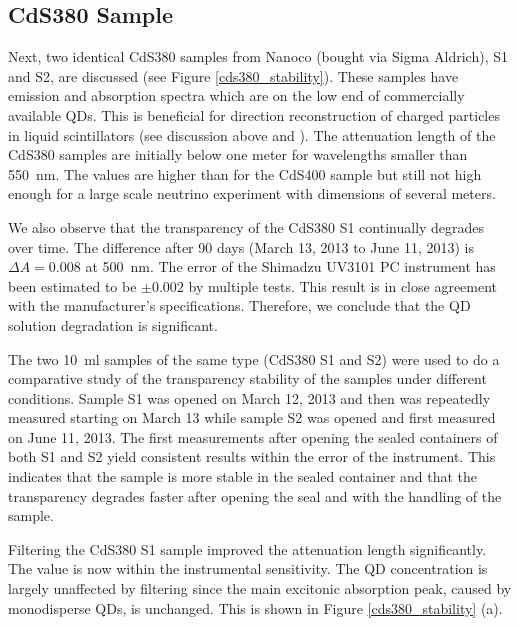 \documentclass[cits]{JINST}
\begin{document}
\subsection{CdS380 Sample}
Next, two identical CdS380 samples from Nanoco (bought via Sigma Aldrich), S1 and S2, are discussed (see Figure \ref{cds380_stability}). These samples have emission and absorption spectra which are on the low end of commercially available QDs. This is beneficial for direction reconstruction of charged particles in liquid scintillators (see discussion above and \cite{mitpaper,simpaper}). The attenuation length of the CdS380 samples are initially below one meter for wavelengths smaller than 550~nm. The values are higher than for the CdS400 sample but still not high enough for a large scale neutrino experiment with dimensions of several meters. 

We also observe that the transparency of the CdS380 S1 continually degrades over time. The difference after 90 days (March 13, 2013 to June 11, 2013) is $\Delta A = 0.008$ at 500~nm. The error of the Shimadzu UV3101 PC instrument has been estimated to be $\pm 0.002$ by multiple tests. This result is in close agreement with the manufacturer's specifications. Therefore, we conclude that the QD solution degradation is significant.
 
The two 10~ml samples of the same type (CdS380 S1 and S2) were used to do a comparative study of the transparency stability of the samples under different conditions. Sample S1 was opened on March 12, 2013 and then was repeatedly measured starting on March 13 while sample S2 was opened and first measured on June 11, 2013. The first measurements after opening the sealed containers of both S1 and S2 yield consistent results within the error of the instrument. This indicates that the sample is more stable in the sealed container and that the transparency degrades faster after opening the seal and with the handling of the sample.    

Filtering the CdS380 S1 sample improved the attenuation length significantly. The value is now within the instrumental sensitivity. The QD concentration is largely unaffected by filtering since the main excitonic absorption peak, caused by monodisperse QDs, is unchanged. This is shown in Figure \ref{cds380_stability} (a).
\end{document}
